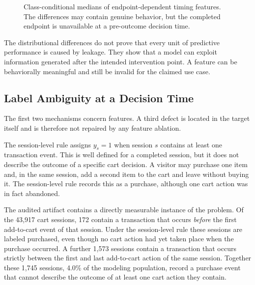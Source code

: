 \documentclass[conference, letterpaper]{IEEEtran}
\begin{document}
\begin{figure}[t]
\centering
{}
\caption{Class-conditional medians of endpoint-dependent timing features. The differences may contain genuine behavior, but the completed endpoint is unavailable at a pre-outcome decision time.}
\label{fig:timing}
\end{figure}

The distributional differences do not prove that every unit of predictive performance is caused by leakage. They show that a model can exploit information generated after the intended intervention point. A feature can be behaviorally meaningful and still be invalid for the claimed use case.

\subsection{Label Ambiguity at a Decision Time}
The first two mechanisms concern features. A third defect is located in the target itself and is therefore not repaired by any feature ablation.

The session-level rule assigns $y_s = 1$ when session $s$ contains at least one transaction event. This is well defined for a completed session, but it does not describe the outcome of a specific cart decision. A visitor may purchase one item and, in the same session, add a second item to the cart and leave without buying it. The session-level rule records this as a purchase, although one cart action was in fact abandoned.

The audited artifact contains a directly measurable instance of the problem. Of the 43,917 cart sessions, 172 contain a transaction that occurs \emph{before} the first add-to-cart event of that session. Under the session-level rule these sessions are labeled purchased, even though no cart action had yet taken place when the purchase occurred. A further 1,573 sessions contain a transaction that occurs strictly between the first and last add-to-cart action of the same session. Together these 1,745 sessions, 4.0\% of the modeling population, record a purchase event that cannot describe the outcome of at least one cart action they contain.
\end{document}
